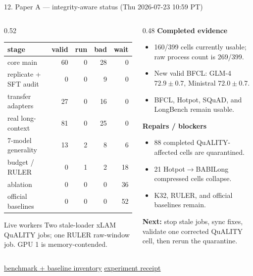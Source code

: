 \documentclass[aspectratio=169]{beamer}
\newcommand{\ghbase}{https://github.com/BDeMo/research-notes/blob/main/notes/plans/08-compressed-context-memory}
\newcommand{\ghA}[2]{\href{\ghbase/papers/paper-a-latent-memory/#1}{\color{blue}\underline{#2}}}
\begin{document}
\begin{frame}{12. Paper A --- integrity-aware status (Thu 2026-07-23 10:59 PT)}
  \begin{columns}[T]
  \begin{column}{0.52\textwidth}
    \centering\scriptsize
    \begin{tabular}{lrrrr}
    \toprule
    stage & valid & run & bad & wait \\
    \midrule
    core main & 60 & 0 & 28 & 0 \\
    replicate + SFT audit & 0 & 0 & 9 & 0 \\
    transfer adapters & 27 & 0 & 16 & 0 \\
    real long-context & 81 & 0 & 25 & 0 \\
    7-model generality & 13 & 2 & 8 & 6 \\
    budget / RULER & 0 & 1 & 2 & 18 \\
    ablation & 0 & 0 & 0 & 36 \\
    official baselines & 0 & 0 & 0 & 52 \\
    \bottomrule
    \end{tabular}
    \vspace{0.2em}
    \begin{block}{Live workers}
      \scriptsize Two stale-loader xLAM QuALITY jobs; one RULER
      raw-window job. GPU 1 is memory-contended.
    \end{block}
  \end{column}
  \begin{column}{0.48\textwidth}
    \textbf{Completed evidence}
    \begin{itemize}\scriptsize
      \item 160/399 cells currently usable; raw process count is 269/399.
      \item New valid BFCL: GLM-4 $72.9\pm0.7$, Ministral $72.0\pm0.7$.
      \item BFCL, Hotpot, SQuAD, and LongBench remain usable.
    \end{itemize}
    \textbf{Repairs / blockers}
    \begin{itemize}\scriptsize
      \item 88 completed QuALITY-affected cells are quarantined.
      \item 21 Hotpot$\to$BABILong compressed cells collapse.
      \item K32, RULER, and official baselines remain.
    \end{itemize}
    \textbf{Next:} \scriptsize stop stale jobs, sync fixes, validate one
    corrected QuALITY cell, then rerun the quarantine.
  \end{column}
  \end{columns}
  \begin{block}{}\footnotesize \ghA{paper-a-full-benchmark-table-2026-07-21.md}{benchmark + baseline inventory} \; \ghA{experiment-receipt-2026-07-16.md}{experiment receipt}\end{block}
\end{frame}
\end{document}
